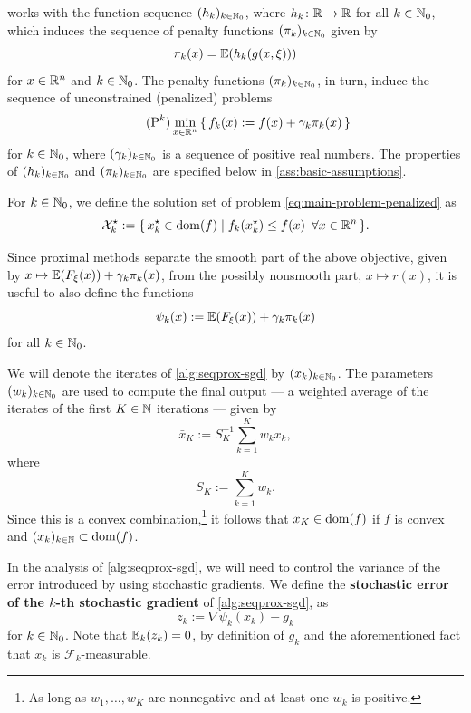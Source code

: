  works with the function sequence $(h_k)_{k\in\mathbb{N}_0}$, where $h_k\colon\mathbb{R}\to\mathbb{R}$ for all $k\in\mathbb{N}_0$,
which induces the sequence of penalty functions $(\pi_k)_{k\in\mathbb{N}_0}$ given by
\[
    \pi_k(x) = \mathbb{E}(h_k(g(x, \xi)))
\]
for $x\in\mathbb{R}^n$ and $k\in\mathbb{N}_0$. The penalty functions $(\pi_k)_{k\in\mathbb{N}_0}$, in turn,
induce the sequence of unconstrained (penalized) problems
\begin{equation}
    \label{eq:main-problem-penalized}
    \tag{$\textnormal{P}^k$}
    \min_{x\in\R^n}
    \left\{\, f_k(x) := f(x) + \gamma_k \pi_k(x) \,\right\}
\end{equation}
for $k\in\mathbb{N}_0$, where $(\gamma_k)_{k\in\mathbb{N}_0}$ is a sequence of positive real numbers.
The properties
of $(h_k)_{k\in\mathbb{N}_0}$ and $(\pi_k)_{k\in\mathbb{N}_0}$ are specified below in \cref{ass:basic-assumptions}.

For $k\in\mathbb{N}_0$, we define the solution set of problem \eqref{eq:main-problem-penalized} as
\[
    \mathcal{X}^\star_k := \{\, x^\star_k\in\operatorname{dom}(f) \mid f_k(x^\star_k) \leq f(x) \enspace \forall x\in\mathbb{R}^n \,\}.
\]

Since proximal methods separate the smooth part of the above objective,
given by $x\mapsto \mathbb{E}(F_\xi(x)) + \gamma_k \pi_k(x)$,
from the possibly nonsmooth part, $x\mapsto r(x)$, it is useful to also define the functions
\[
    \psi_k(x) := \mathbb{E}(F_\xi(x)) + \gamma_k \pi_k(x)
\]
for all $k\in\mathbb{N}_0$.

We will denote the iterates of \cref{alg:seqprox-sgd} by $(x_k)_{k\in\mathbb{N}_0}$.
The parameters $(w_k)_{k\in\mathbb{N}_0}$ are used to compute the final output --- a weighted average
of the iterates of the first $K\in\mathbb{N}$ iterations --- given by
\[
    \bar{x}_K := S_K^{-1} \sum_{k=1}^K w_k x_k,
\]
where
\[
    S_K := \sum_{k=1}^K w_k.
\]
Since this is a convex combination,\footnote{As long as $w_1,\dots,w_K$ are nonnegative and at least one $w_k$ is positive.}
it follows that $\bar{x}_K \in \operatorname{dom}(f)$ if
$f$ is convex and $(x_k)_{k\in\mathbb{N}} \subset \operatorname{dom}(f)$.

In the analysis of \cref{alg:seqprox-sgd}, we will
need to control the variance of the error introduced by
using stochastic gradients. We define the \textbf{stochastic error of the $k$-th stochastic gradient}
of \cref{alg:seqprox-sgd}, as
\begin{equation}
    \label{eq:zk}
    z_k := \nabla \psi_k(x_k) - g_k    
\end{equation}
for $k\in\mathbb{N}_0$. Note that $\mathbb{E}_k(z_k) = 0$, by definition of $g_k$
and the aforementioned fact that $x_k$ is $\mathcal{F}_k$-measurable.

